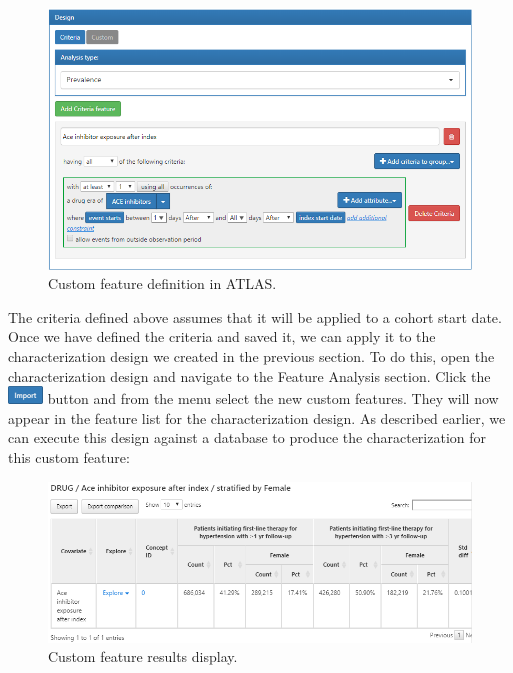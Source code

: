 \documentclass[11pt]{book}
\theoremstyle{definition}
\theoremstyle{definition}
\theoremstyle{definition}
\theoremstyle{remark}
\begin{document}
\begin{figure}

{\centering \includegraphics[width=1\linewidth]{images/Characterization/atlasCharacterizationCustomFeature} 

}

\caption{Custom feature definition in ATLAS.}\label{fig:atlasCharacterizationCustomFeature}
\end{figure}

The criteria defined above assumes that it will be applied to a cohort start date. Once we have defined the criteria and saved it, we can apply it to the characterization design we created in the previous section. To do this, open the characterization design and navigate to the Feature Analysis section. Click the \includegraphics{images/Characterization/atlasImportButton.png} button and from the menu select the new custom features. They will now appear in the feature list for the characterization design. As described earlier, we can execute this design against a database to produce the characterization for this custom feature:

\begin{figure}

{\centering \includegraphics[width=1\linewidth]{images/Characterization/atlasCharacterizationCustomFeatureResults} 

}

\caption{Custom feature results display.}\label{fig:atlasCharacterizationCustomFeatureResults}
\end{figure}
\end{document}
